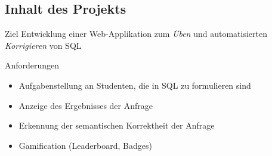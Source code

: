 \subsection{Inhalt des Projekts}

\begin{frame}{\insertsectionhead}{\insertsubsectionhead}
  \begin{block}{Ziel}
    Entwicklung einer Web-Applikation zum \emph{Üben} und automatisierten \emph{Korrigieren} von SQL
  \end{block}

  \pause

  \begin{block}{Anforderungen}
    \begin{itemize}
      \item Aufgabenstellung an Studenten, die in SQL zu formulieren sind
      \item Anzeige des Ergebnisses der Anfrage
      \item Erkennung der semantischen Korrektheit der Anfrage
      \item Gamification (Leaderboard, Badges)
    \end{itemize}
  \end{block}
\end{frame}

